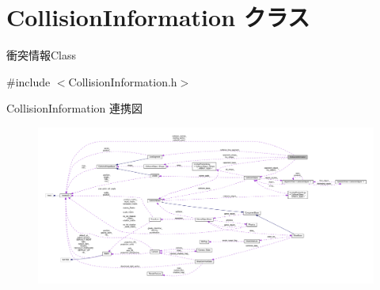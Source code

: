 \hypertarget{class_collision_information}{}\section{Collision\+Information クラス}
\label{class_collision_information}


衝突情報\+Class  




{\ttfamily \#include $<$Collision\+Information.\+h$>$}



Collision\+Information 連携図\nopagebreak
\begin{figure}[H]
\begin{center}
\leavevmode
\includegraphics[width=350pt]{class_collision_information__coll__graph}
\end{center}
\end{figure}
